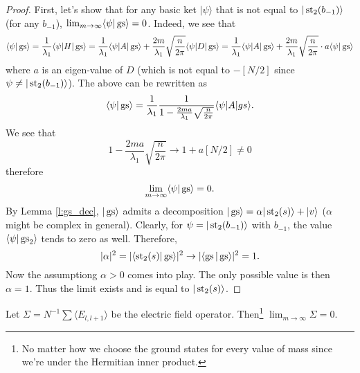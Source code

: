 \begin{proof}
First, let's show that for any basic ket $|\psi\rangle$ that is not equal to $|\operatorname{st}_2(b_{-1})\rangle$ (for any $b_{-1}$), $\lim_{m \rightarrow \infty} \langle \psi | \operatorname{gs}\rangle = 0$. Indeed, we see that
\[
\langle \psi | \operatorname{gs} \rangle = \frac{1}{\lambda_1} \langle \psi | H|\operatorname{gs}\rangle = \frac{1}{\lambda_1} \langle \psi |A|\operatorname{gs}\rangle + \frac{2m}{\lambda_1} \sqrt{\frac{n}{2\pi}} \langle \psi | D | \operatorname{gs} \rangle = \frac{1}{\lambda_1} \langle \psi |A|\operatorname{gs}\rangle + \frac{2m}{\lambda_1} \sqrt{\frac{n}{2\pi}} \cdot a \langle \psi | \operatorname{gs} \rangle
\]
where $a$ is an eigen-value of $D$ (which is not equal to $-[N/2]$ since $\psi \neq |\operatorname{st}_2(b_{-1})\rangle$). The above can be rewritten as
\[
\langle \psi | \operatorname{gs}\rangle = \frac{1}{\lambda_1} \frac{1}{1- \frac{2ma}{\lambda_1}\sqrt{\frac{n}{2\pi}} } \langle \psi | A | gs\rangle.
\]
We see that 
\[
1- \frac{2ma}{\lambda_1}\sqrt{\frac{n}{2\pi}} \rightarrow 1 + a [N/2] \neq 0
\]
therefore
\[
\lim_{m \rightarrow \infty}\langle \psi | \operatorname{gs} \rangle = 0.
\]
By Lemma \ref{l:gs_dec}, $|\operatorname{gs}\rangle$ admits a decomposition $|\operatorname{gs}\rangle = \alpha|\operatorname{st}_2(s)\rangle + |v\rangle$ ($\alpha$ might be complex in general). Clearly, for $\psi = |\operatorname{st}_2(b_{-1})\rangle$ with $b_{-1}$, the value $\langle \psi | \operatorname{gs}_2\rangle$ tends to zero as well. Therefore,
\[
|\alpha|^2 = |\langle \operatorname{st}_2(s) | \operatorname{gs} \rangle|^2 \rightarrow |\langle \operatorname{gs} | \operatorname{gs} \rangle|^2 =1.
\]
Now the assumptiong $\alpha > 0$ comes into play. The only possible value is then $\alpha = 1$. Thus the limit exists and is equal to $|\operatorname{st}_2(s)\rangle$.
\end{proof}
\begin{corp}
Let $\Sigma = N^{-1}\sum \langle E_{l,l+1} \rangle$ be the electric field operator. Then\footnote{No matter how we choose the ground states for every value of mass since we're under the Hermitian inner product.} $\lim_{m \rightarrow \infty} \Sigma = 0$.
\end{corp}
